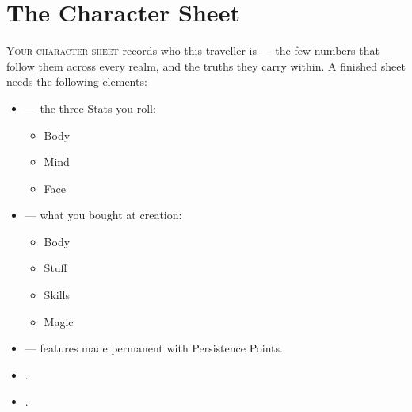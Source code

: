 \renewcommand{\realmaccent}{atrAccent}  %
\chapter{The Character Sheet}
\begin{readaloud}
\lipsum[50][1-3]
\end{readaloud}

\lettrine{Y}{our character sheet} records who this traveller is --- the few
numbers that follow them across every realm, and the truths they carry
within. A finished sheet needs the following elements:

\begin{itemize}
  \item {} --- the three Stats you roll:
    \begin{itemize}
      \item Body
      \item Mind
      \item Face
    \end{itemize}
  \item {} --- what you bought at creation:
    \begin{itemize}
      \item Body
      \item Stuff
      \item Skills
      \item Magic
    \end{itemize}
  \item {} --- features made permanent with Persistence Points.
  \item {}.
  \item {}.
\end{itemize}

